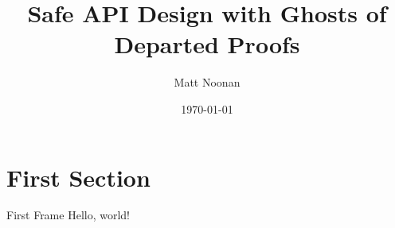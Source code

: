 \documentclass{beamer}
\title{Safe API Design with Ghosts of Departed Proofs}
\date{\today}
\author{Matt Noonan}
\institute{Kataskeue LLC \& Input Output HK}
\begin{document}
  \maketitle
  \section{First Section}
  \begin{frame}{First Frame}
    Hello, world!
  \end{frame}
\end{document}
